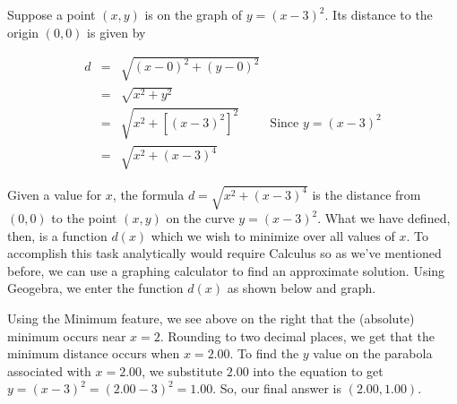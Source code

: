 {
Suppose a point $(x,y)$ is on the graph of $y = (x-3)^2$.  Its distance to the origin $(0,0)$ is given by
 
\setlength{\extrarowheight}{8pt}

\[ \begin{array}{rclr} 

d & = &  \sqrt{(x-0)^2+(y-0)^2} & \\
& = &  \sqrt{x^2+y^2} &  \\
&= & \sqrt{x^2 + \left[(x-3)^2\right]^2} & \mbox{Since $y = (x-3)^2$} \\
& = & \sqrt{x^2 + (x-3)^4} & 

\end{array} \]

\setlength{\extrarowheight}{2pt}

Given a value for $x$, the formula $d =  \sqrt{x^2 + (x-3)^4} $ is the distance from $(0,0)$ to the point $(x,y)$ on the curve $y = (x-3)^2$.  What we have defined, then, is a function $d(x)$ which we wish to minimize over all values of $x$.  To accomplish this task analytically would require Calculus so as we've mentioned before, we can use a graphing calculator to find an approximate solution.   Using Geogebra, we enter the function $d(x)$ as shown below and graph.


Using the Minimum feature, we see above on the right that the (absolute) minimum occurs near $x=2$.  Rounding to two decimal places, we get that the minimum distance occurs when $x = 2.00$.  To find the $y$ value on the parabola associated with $x = 2.00$, we substitute $2.00$ into the equation to get $y = (x-3)^2 = (2.00-3)^2 = 1.00$.  So, our final answer is $(2.00,1.00).$
}




